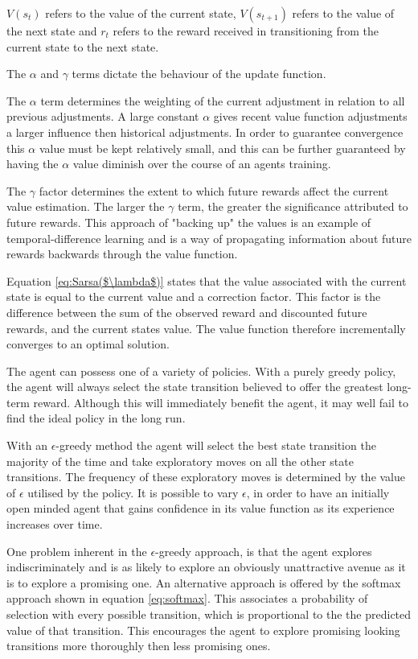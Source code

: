 \documentclass{rucsthesis}
\begin{document}
$V(s_t)$ refers to the value of the current state, $V(s_{t+1})$ refers to the value of the next state and $r_t$ refers to the reward received in transitioning from the current state to the next state. 

The $\alpha$ and $\gamma$ terms dictate the behaviour of the update function. 

The $\alpha$ term determines the weighting of the current adjustment in relation to all previous adjustments. A large constant $\alpha$ gives recent value function adjustments a larger influence then historical adjustments. In order to guarantee convergence this $\alpha$ value must be kept relatively small, and this can be further guaranteed by having the $\alpha$ value diminish over the course of an agents training. 

The $\gamma$ factor determines the extent to which future rewards affect the current value estimation. The larger the $\gamma$ term, the greater the significance attributed to future rewards. This approach of "backing up" the values is an example of temporal-difference learning\citep{suttonbarto} and is a way of propagating information about future rewards backwards through the value function.

Equation \ref{eq:Sarsa($\lambda$)} states that the value associated with the current state is equal to the current value and a correction factor. This factor is the difference between the sum of the observed reward and discounted future rewards, and the current states value. The value function therefore incrementally converges to an optimal solution.

The agent can possess one of a variety of policies. With a purely greedy policy, the agent will always select the state transition believed to offer the greatest long-term reward. Although this will immediately benefit the agent, it may well fail to find the ideal policy in the long run. 

With an $\epsilon$-greedy method the agent will select the best state transition the majority of the time and take exploratory moves on all the other state transitions. The frequency of these exploratory moves is determined by the value of $\epsilon$ utilised by the policy. It is possible to vary $\epsilon$, in order to have an initially open minded agent that gains confidence in its value function as its experience increases over time. 

One problem inherent in the $\epsilon$-greedy approach, is that the agent explores indiscriminately and is as likely to explore an obviously unattractive avenue as it is to explore a promising one. An alternative approach is offered by the softmax approach shown in equation \ref{eq:softmax}. This associates a probability of selection with every possible transition, which is proportional to the the predicted value of that transition. This encourages the agent to explore promising looking transitions more thoroughly then less promising ones.
\end{document}
